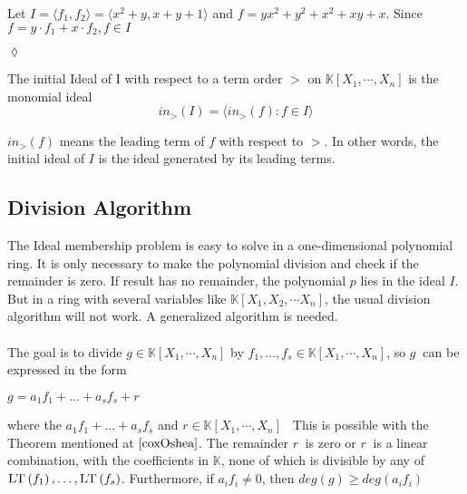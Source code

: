 \newpage

\begin{env_example}\normalfont
Let $ I= \langle f_{1},f_{2} \rangle = \langle x^{2}+y, x+y+1 \rangle $ and $f=yx^{2}+y^{2}+x^{2}+xy+x$. Since $f= y \cdot f_{1} + x \cdot f_{2}, f\in I$
\begin{flushright}
$\lozenge$
\end{flushright} 
\end{env_example}


\begin{env_definition}
\cite{tigers} The initial Ideal of I with respect to a term order $>$ on $\mathbb{K}\left[X_{1}, \cdots, X_{n}\right]$ is the monomial ideal \\
\[in_{>}(I) = \langle in_{>}(f) : f \in I  \rangle \] 

\end{env_definition}
$in_{>}(f)$ means the leading term of $f$ with respect to $>$. In other words, the initial ideal of $I$ is the ideal generated by its leading terms.



\subsection{Division Algorithm}
\label{subsec:division}

The Ideal membership problem is easy to solve in a one-dimensional polynomial ring. It is only necessary to make the polynomial division and check if the remainder is zero. 
If result has no remainder, the polynomial $p$ lies in the ideal $I$.
But in a ring with several variables like $ \mathbb{K} \left[X_{1},X_{2},\cdots X_{n}\right]$, the usual division algorithm will not work. A generalized algorithm is needed.\\ \\
The goal is to divide $g \in \mathbb{K}\left[X_{1}, \cdots, X_{n}\right] $ by 
$f_{1}, \ldots, f_{s} \in \mathbb{K}\left[X_{1}, \cdots, X_{n}\right]$, so $g~$ can be expressed in the form \begin{center}
$g = a_{1}f_{1}+ \ldots + a_{s}f_{s} +r$
\end{center} 
where the $a_{1}f_{1}+ \ldots + a_{s}f_{s} $ and $r \in \mathbb{K}\left[X_{1}, \cdots, X_{n}\right]$ \
This is possible with the Theorem mentioned at  $\cite{coxOshea}$.
The remainder $r~$ is zero or $r~$ is a linear combination, with the coefficients in $\mathbb{K}$, none of which is divisible by any of
$\textsc{LT}\left(f_{1} \right), \ldots, \textsc{LT}\left(f_{s} \right)  $.
Furthermore, if $a_{i}f_{i} \neq 0 $, then
$deg(g) \geq deg(a_{i}f_{i})$

